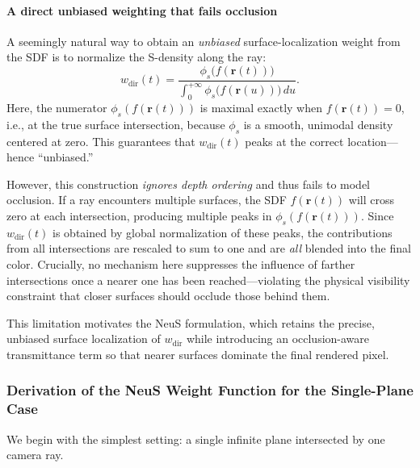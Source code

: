 \begin{enrichment}
\begin{enrichment}
        \paragraph{A direct unbiased weighting that fails occlusion}
        A seemingly natural way to obtain an \emph{unbiased} surface-localization weight from the SDF is to normalize the S-density along the ray:
        \[
        w_{\text{dir}}(t) =
        \frac{\phi_s\big(f(\mathbf{r}(t))\big)}{\int_{0}^{+\infty} \phi_s\big(f(\mathbf{r}(u))\big) \, du}.
        \]
        Here, the numerator $\phi_s(f(\mathbf{r}(t)))$ is maximal exactly when $f(\mathbf{r}(t))=0$, i.e., at the true surface intersection, because $\phi_s$ is a smooth, unimodal density centered at zero. This guarantees that $w_{\text{dir}}(t)$ peaks at the correct location—hence ``unbiased.''
        
        However, this construction \emph{ignores depth ordering} and thus fails to model occlusion. If a ray encounters multiple surfaces, the SDF $f(\mathbf{r}(t))$ will cross zero at each intersection, producing multiple peaks in $\phi_s(f(\mathbf{r}(t)))$. Since $w_{\text{dir}}(t)$ is obtained by global normalization of these peaks, the contributions from all intersections are rescaled to sum to one and are \emph{all} blended into the final color. Crucially, no mechanism here suppresses the influence of farther intersections once a nearer one has been reached—violating the physical visibility constraint that closer surfaces should occlude those behind them. 
        
        This limitation motivates the NeuS formulation, which retains the precise, unbiased surface localization of $w_{\text{dir}}$ while introducing an occlusion-aware transmittance term so that nearer surfaces dominate the final rendered pixel.
        
        \subsubsection{Derivation of the NeuS Weight Function for the Single-Plane Case}
        \label{subsubsec:chapter23_neus_singleplane}
        
        We begin with the simplest setting: a single infinite plane intersected by one camera ray.
        

\end{enrichment}
\end{enrichment}
